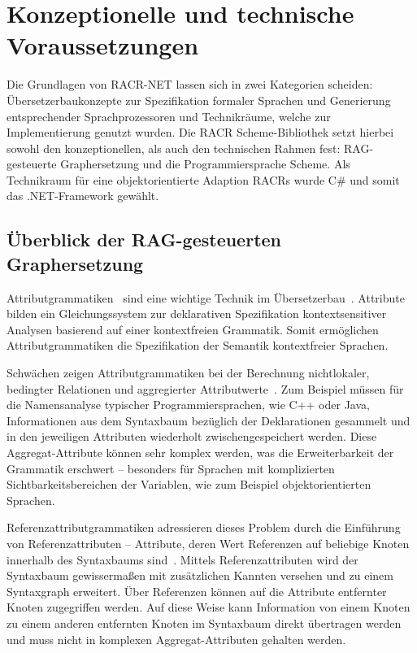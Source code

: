 

\chapter{Konzeptionelle und technische Voraussetzungen}\label{voraussetzungen}

Die Grundlagen von RACR-NET lassen sich in zwei Kategorien scheiden: Übersetzerbaukonzepte zur Spezifikation formaler Sprachen und Generierung entsprechender Sprachprozessoren und Technikräume, welche zur Implementierung genutzt wurden. Die RACR Scheme-Bibliothek setzt hierbei sowohl den konzeptionellen, als auch den technischen Rahmen fest:
RAG-gesteuerte Graphersetzung und die Programmiersprache Scheme. Als Technikraum für eine objektorientierte Adaption RACRs wurde C\# und somit das .NET-Framework gewählt.

\section{Überblick der RAG-gesteuerten Graphersetzung}

Attributgrammatiken~\cite{Knuth1968,Knuth1971,Paakki1995} sind eine wichtige Technik im Übersetzerbau~\cite{Lam2006}. Attribute bilden ein Gleichungssystem zur deklarativen Spezifikation kontextsensitiver Analysen basierend auf einer kontextfreien Grammatik. Somit ermöglichen Attributgrammatiken die Spezifikation der Semantik kontextfreier Sprachen.

Schwächen zeigen Attributgrammatiken bei der Berechnung nichtlokaler, bedingter Relationen und aggregierter Attributwerte~\cite{Hoover1986}. Zum Beispiel müssen für die Namensanalyse typischer Programmiersprachen, wie C++ oder Java, Informationen aus dem Syntaxbaum bezüglich der Deklarationen gesammelt und in den jeweiligen Attributen wiederholt zwischengespeichert werden. Diese Aggregat-Attribute können sehr komplex werden, was die Erweiterbarkeit der Grammatik erschwert – besonders für Sprachen mit komplizierten Sichtbarkeitsbereichen der Variablen, wie zum Beispiel objektorientierten Sprachen.

Referenzattributgrammatiken adressieren dieses Problem durch die Einführung von Referenzattributen – Attribute, deren Wert Referenzen auf beliebige Knoten innerhalb des Syntaxbaums sind~\cite{Hedin2000}. Mittels Referenzattributen wird der Syntaxbaum gewissermaßen mit zusätzlichen Kannten versehen und zu einem Syntaxgraph erweitert. Über Referenzen können auf die Attribute entfernter Knoten zugegriffen werden. Auf diese Weise kann Information von einem Knoten zu einem anderen entfernten Knoten im Syntaxbaum direkt übertragen werden und muss nicht in komplexen Aggregat-Attributen gehalten werden.

